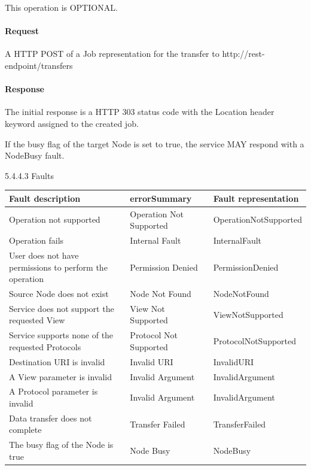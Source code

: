 \documentclass[11pt,a4paper]{ivoa}
\begin{document}
This operation is OPTIONAL.

\paragraph{Request}
A HTTP POST of a Job representation for the transfer to http://rest-endpoint/transfers

\paragraph{Response}
The initial response is a HTTP 303 status code with the Location header keyword assigned to the created job.

If the busy flag of the target Node is set to true, the service MAY respond with a NodeBusy fault.

5.4.4.3 Faults

\vspace{3mm}
\begin{tabular}{ p{5cm} l p{4cm} }
\textbf{Fault description} & \textbf{errorSummary} & \textbf{Fault representation} \\
\hline
Operation not supported & Operation Not Supported & OperationNotSupported \\
\hline
Operation fails & Internal Fault & InternalFault \\
\hline
User does not have permissions to perform the operation	 & Permission Denied & PermissionDenied \\
\hline
Source Node does not exist & Node Not Found & NodeNotFound \\
\hline
Service does not support the requested View & View Not Supported & ViewNotSupported \\
\hline
Service supports none of the requested Protocols & Protocol Not Supported &ProtocolNotSupported \\
\hline
Destination URI is invalid & Invalid URI & InvalidURI \\
\hline
A View parameter is invalid & Invalid Argument & InvalidArgument \\
\hline
A Protocol parameter is invalid & Invalid Argument & InvalidArgument \\
\hline
Data transfer does not complete & Transfer Failed & TransferFailed \\
\hline
The busy flag of the Node is true & Node Busy & NodeBusy \\
\hline
\end{tabular}
\vspace{3mm}
\end{document}
